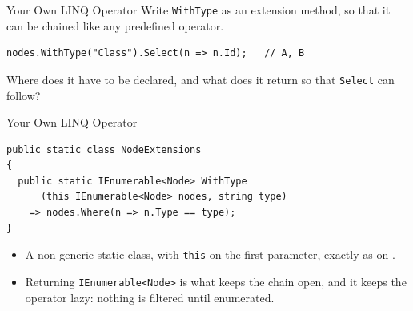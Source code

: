 \begin{exerciseframe}{Your Own LINQ Operator}
  Write \texttt{WithType} as an extension method, so that it can be chained
  like any predefined operator.
  \vspace{1ex}

  \begin{lstlisting}[basicstyle=\scriptsize\ttfamily]
nodes.WithType("Class").Select(n => n.Id);   // A, B
  \end{lstlisting}
  \vspace{1ex}

  Where does it have to be declared, and what does it return so that
  \texttt{Select} can follow?
\end{exerciseframe}

\begin{solutionframe}{Your Own LINQ Operator}
  \begin{lstlisting}[basicstyle=\scriptsize\ttfamily]
public static class NodeExtensions
{
  public static IEnumerable<Node> WithType
      (this IEnumerable<Node> nodes, string type)
    => nodes.Where(n => n.Type == type);
}
  \end{lstlisting}
  \begin{itemize}
    \item A non-generic static class, with \texttt{this} on the first
      parameter, exactly as on .
    \item Returning \texttt{IEnumerable<Node>} is what keeps the chain open,
      and it keeps the operator lazy: nothing is filtered until enumerated.
  \end{itemize}
  \vspace{4ex}

\end{solutionframe}